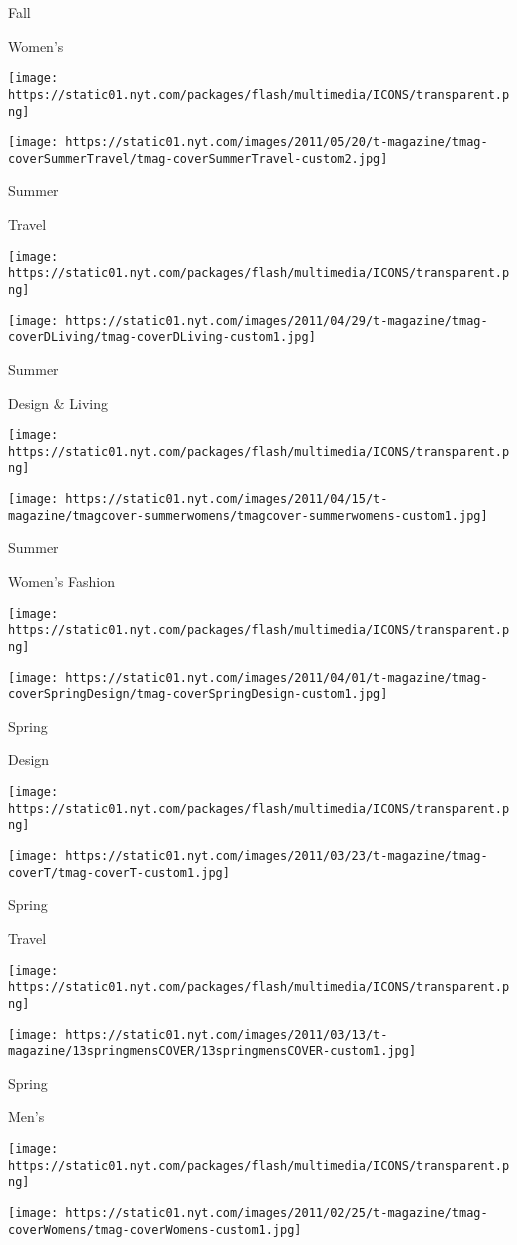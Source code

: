 Fall

Women's

\texttt{[image: https://static01.nyt.com/packages/flash/multimedia/ICONS/transparent.png]}

\texttt{[image: https://static01.nyt.com/images/2011/05/20/t-magazine/tmag-coverSummerTravel/tmag-coverSummerTravel-custom2.jpg]}

Summer

Travel

\texttt{[image: https://static01.nyt.com/packages/flash/multimedia/ICONS/transparent.png]}

\texttt{[image: https://static01.nyt.com/images/2011/04/29/t-magazine/tmag-coverDLiving/tmag-coverDLiving-custom1.jpg]}

Summer

Design \& Living

\texttt{[image: https://static01.nyt.com/packages/flash/multimedia/ICONS/transparent.png]}

\texttt{[image: https://static01.nyt.com/images/2011/04/15/t-magazine/tmagcover-summerwomens/tmagcover-summerwomens-custom1.jpg]}

Summer

Women's Fashion

\texttt{[image: https://static01.nyt.com/packages/flash/multimedia/ICONS/transparent.png]}

\texttt{[image: https://static01.nyt.com/images/2011/04/01/t-magazine/tmag-coverSpringDesign/tmag-coverSpringDesign-custom1.jpg]}

Spring

Design

\texttt{[image: https://static01.nyt.com/packages/flash/multimedia/ICONS/transparent.png]}

\texttt{[image: https://static01.nyt.com/images/2011/03/23/t-magazine/tmag-coverT/tmag-coverT-custom1.jpg]}

Spring

Travel

\texttt{[image: https://static01.nyt.com/packages/flash/multimedia/ICONS/transparent.png]}

\texttt{[image: https://static01.nyt.com/images/2011/03/13/t-magazine/13springmensCOVER/13springmensCOVER-custom1.jpg]}

Spring

Men's

\texttt{[image: https://static01.nyt.com/packages/flash/multimedia/ICONS/transparent.png]}

\texttt{[image: https://static01.nyt.com/images/2011/02/25/t-magazine/tmag-coverWomens/tmag-coverWomens-custom1.jpg]}


